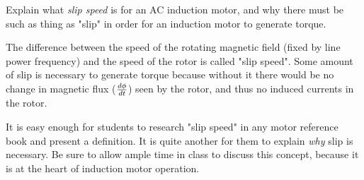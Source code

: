 

Explain what {\it slip speed} is for an AC induction motor, and why there must be such as thing as "slip" in order for an induction motor to generate torque.







The difference between the speed of the rotating magnetic field (fixed by line power frequency) and the speed of the rotor is called "slip speed".  Some amount of slip is necessary to generate torque because without it there would be no change in magnetic flux ($d\phi \over dt$) seen by the rotor, and thus no induced currents in the rotor.







It is easy enough for students to research "slip speed" in any motor reference book and present a definition.  It is quite another for them to explain {\it why} slip is necessary.  Be sure to allow ample time in class to discuss this concept, because it is at the heart of induction motor operation.




